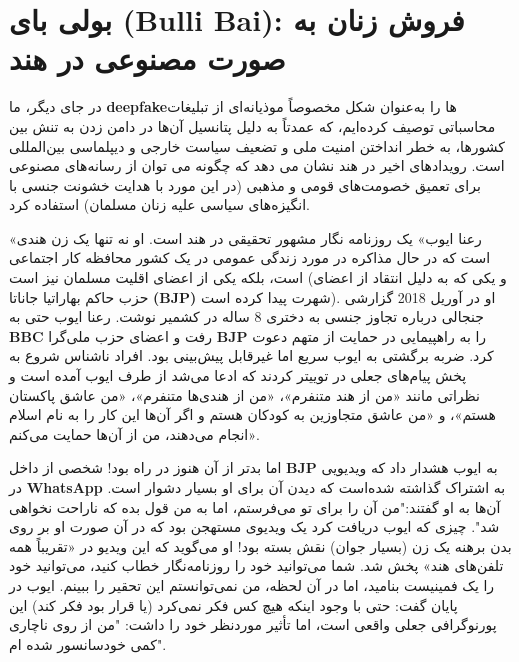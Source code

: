 {
{
\section*{بولی بای \textenglish{\textbf{(Bulli Bai)}}: فروش زنان به صورت مصنوعی در هند}
}
\label{sec:بولی بای (Bulli Bai): فروش زنان به صورت مصنوعی در هند}
\noindent در جای دیگر، ما \textenglish{\textbf{deepfake}}‌ها را به‌عنوان شکل مخصوصاً موذیانه‌ای از تبلیغات محاسباتی توصیف کرده‌ایم، که عمدتاً به دلیل پتانسیل آن‌ها در دامن زدن به تنش بین کشورها، به خطر انداختن امنیت ملی و تضعیف سیاست خارجی و دیپلماسی بین‌المللی است. رویدادهای اخیر در هند نشان می دهد که چگونه می توان از رسانه‌های مصنوعی برای تعمیق خصومت‌های قومی و مذهبی (در این مورد با هدایت خشونت جنسی با انگیزه‌های سیاسی علیه زنان مسلمان) استفاده کرد.
}

«رعنا ایوب» یک روزنامه نگار مشهور تحقیقی در هند است.
او نه تنها یک زن هندی است که در حال مذاکره در مورد زندگی عمومی در یک کشور محافظه کار اجتماعی است، بلکه یکی از اعضای اقلیت مسلمان نیز است (و یکی که به دلیل انتقاد از اعضای حزب حاکم بهاراتیا جاناتا \textenglish{\textbf{(BJP)}} شهرت پیدا کرده است).
او در آوریل 2018 گزارشی جنجالی درباره تجاوز جنسی به دختری 8 ساله در کشمیر نوشت.
رعنا ایوب حتی به \textenglish{\textbf{BBC}} رفت و اعضای حزب ملی‌گرا \textenglish{\textbf{BJP}} را به راهپیمایی در حمایت از متهم دعوت کرد.
ضربه برگشتی به ایوب سریع اما غیرقابل پیش‌بینی بود.
افراد ناشناس شروع به پخش پیام‌های جعلی در توییتر کردند که ادعا می‌شد از طرف ایوب آمده است و نظراتی مانند «من از هند متنفرم»، «من از هندی‌ها متنفرم»، «من عاشق پاکستان هستم»، و «من عاشق متجاوزین به کودکان هستم و اگر آن‌ها این کار را به نام اسلام انجام می‌دهند، من از آن‌ها حمایت می‌کنم».

اما بدتر از آن هنوز در راه بود!
شخصی از داخل \textenglish{\textbf{BJP}} به ایوب هشدار داد که ویدیویی در \textenglish{\textbf{WhatsApp}} به اشتراک گذاشته شده‌است که دیدن آن برای او بسیار دشوار است.
آن‌ها به او گفتند:"من آن را برای تو می‌فرستم، اما به من قول بده که ناراحت نخواهی شد".
چیزی که ایوب دریافت کرد یک ویدیوی مستهجن بود که در آن صورت او بر روی بدن برهنه یک زن (بسیار جوان) نقش بسته بود!
او می‌گوید که این ویدیو در «تقریباً همه تلفن‌های هند» پخش شد.
شما می‌توانید خود را روزنامه‌نگار خطاب کنید، می‌توانید خود را یک فمینیست بنامید، اما در آن لحظه، من نمی‌توانستم این تحقیر را ببینم.
ایوب در پایان گفت: حتی با وجود اینکه هیچ کس فکر نمی‌کرد (یا قرار بود فکر کند) این پورنوگرافی جعلی واقعی است، اما تأثیر مورد‌نظر خود را داشت: "من از روی ناچاری کمی خودسانسور شده ام".


